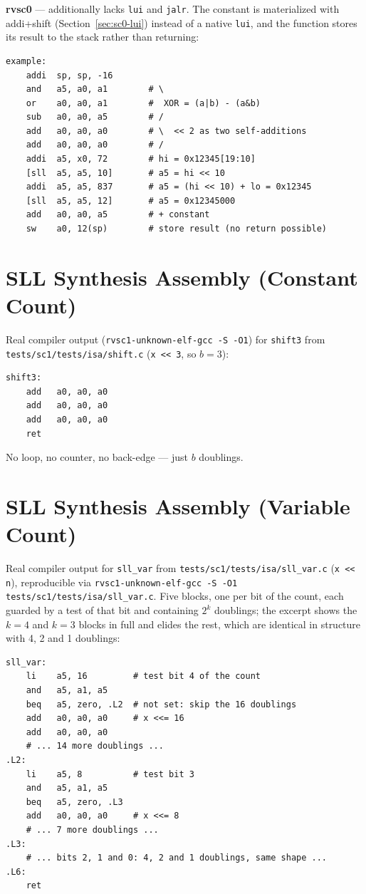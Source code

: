 \textbf{rvsc0} --- additionally lacks \texttt{lui} and \texttt{jalr}. The constant is materialized
with addi+shift (Section~\ref{sec:sc0-lui}) instead of a native \texttt{lui}, and the function stores
its result to the stack rather than returning:

\begin{lstlisting}
example:
    addi  sp, sp, -16
    and   a5, a0, a1        # \
    or    a0, a0, a1        #  XOR = (a|b) - (a&b)
    sub   a0, a0, a5        # /
    add   a0, a0, a0        # \  << 2 as two self-additions
    add   a0, a0, a0        # /
    addi  a5, x0, 72        # hi = 0x12345[19:10]
    [sll  a5, a5, 10]       # a5 = hi << 10
    addi  a5, a5, 837       # a5 = (hi << 10) + lo = 0x12345
    [sll  a5, a5, 12]       # a5 = 0x12345000
    add   a0, a0, a5        # + constant
    sw    a0, 12(sp)        # store result (no return possible)
\end{lstlisting}


\chapter{SLL Synthesis Assembly (Constant Count)} \label{apx:sll-const-asm}

Real compiler output (\nolinkurl{rvsc1-unknown-elf-gcc -S -O1}) for \texttt{shift3} from
\nolinkurl{tests/sc1/tests/isa/shift.c} (\texttt{x << 3}, so $b = 3$):

\begin{lstlisting}
shift3:
    add   a0, a0, a0
    add   a0, a0, a0
    add   a0, a0, a0
    ret
\end{lstlisting}

No loop, no counter, no back-edge --- just $b$ doublings.


\chapter{SLL Synthesis Assembly (Variable Count)} \label{apx:sll-asm}

Real compiler output for \texttt{sll\_var} from \texttt{tests/sc1/tests/isa/sll\_var.c}
(\texttt{x << n}), reproducible via
\nolinkurl{rvsc1-unknown-elf-gcc -S -O1 tests/sc1/tests/isa/sll\_var.c}. Five blocks, one per bit of the
count, each guarded by a test of that bit and containing $2^k$ doublings; the excerpt shows the $k=4$
and $k=3$ blocks in full and elides the rest, which are identical in structure with 4, 2 and 1
doublings:

\begin{lstlisting}
sll_var:
    li    a5, 16         # test bit 4 of the count
    and   a5, a1, a5
    beq   a5, zero, .L2  # not set: skip the 16 doublings
    add   a0, a0, a0     # x <<= 16
    add   a0, a0, a0
    # ... 14 more doublings ...
.L2:
    li    a5, 8          # test bit 3
    and   a5, a1, a5
    beq   a5, zero, .L3
    add   a0, a0, a0     # x <<= 8
    # ... 7 more doublings ...
.L3:
    # ... bits 2, 1 and 0: 4, 2 and 1 doublings, same shape ...
.L6:
    ret
\end{lstlisting}


